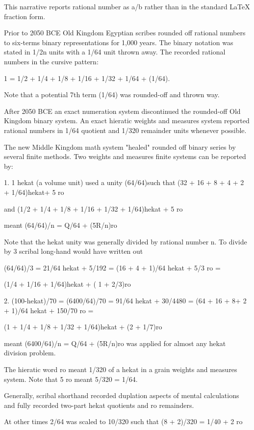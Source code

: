 \documentclass[12pt]{article}
\begin{document}
This narrative reports rational number as a/b rather than in the standard LaTeX fraction form.

Prior to 2050 BCE Old Kingdom Egyptian scribes rounded off rational numbers to six-terms binary representations for 1,000 years. The binary notation was stated in 1/2n units with a 1/64 unit thrown away. The  recorded rational numbers in the cursive pattern:

1 = 1/2 + 1/4 + 1/8 + 1/16 + 1/32 + 1/64 + (1/64).

Note that a potential 7th term (1/64) was rounded-off and thrown way.

After 2050 BCE an exact numeration system discontinued the rounded-off Old Kingdom binary system. An exact hieratic weights and measures system reported rational numbers in 1/64 quotient and 1/320 remainder units whenever possible.

The new Middle Kingdom math system "healed" rounded off binary series by several finite methods. Two weights and measures finite systems can be reported by:

1. 1 hekat (a volume unit) used a unity (64/64)such that (32 + 16 + 8 + 4 + 2 + 1/64)hekat+ 5 ro 

and (1/2 + 1/4 + 1/8 + 1/16 + 1/32 + 1/64)hekat + 5 ro

meant (64/64)/n = Q/64 + (5R/n)ro

Note that the hekat unity was generally divided by rational number n. To divide by 3 scribal long-hand would have written out

(64/64)/3 = 21/64 hekat + 5/192 = (16 + 4 + 1)/64 hekat + 5/3 ro =

(1/4 + 1/16 + 1/64)hekat + ( 1 + 2/3)ro 

2. (100-hekat)/70 = (6400/64)/70 = 91/64 hekat + 30/4480 = (64 + 16 + 8+ 2 + 1)/64 hekat + 150/70 ro =

(1 + 1/4 + 1/8 + 1/32 + 1/64)hekat + (2 + 1/7)ro

meant (6400/64)/n = Q/64 + (5R/n)ro was applied for almost any hekat division problem.

The hieratic word ro meant 1/320 of a hekat in a grain weights and measures system. Note that 5 ro meant 5/320 = 1/64.

Generally, scribal shorthand recorded duplation aspects of mental calculations and fully recorded two-part hekat quotients and ro remainders.

At other times 2/64 was scaled to 10/320 such that (8 + 2)/320 = 1/40 + 2 ro
\end{document}

